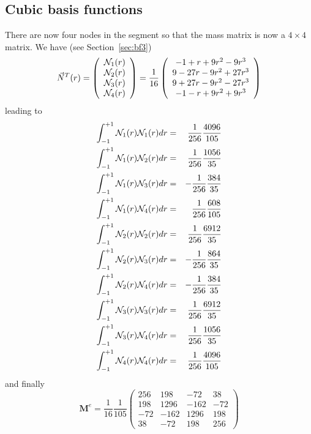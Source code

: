 \subsection{Cubic basis functions}
There are now four nodes in the segment so that the mass matrix 
is now a $4\times4$ matrix. We have (see Section~\ref{sec:bf3}) 
\begin{equation}
{\vec N}^T(r) = 
\left(
\begin{array}{c}
{\mathcal{N}}_1(r) \\ 
{\mathcal{N}}_2(r) \\ 
{\mathcal{N}}_3(r) \\ 
{\mathcal{N}}_4(r) 
\end{array}
\right)
=
\frac{1}{16}
\left(
\begin{array}{c}
 -1+  r+9r^2- 9r^3  \\ 
  9-27r-9r^2+27r^3  \\
  9+27r-9r^2-27r^3  \\
 -1-  r+9r^2+ 9r^3  
\end{array}
\right)
\end{equation}
leading to
\begin{eqnarray}
\int_{-1}^{+1} {\mathcal{N}}_1(r) {\mathcal{N}}_1(r) dr &=&  \frac{1}{256}\frac{4096}{105} \nonumber\\ 
\int_{-1}^{+1} {\mathcal{N}}_1(r) {\mathcal{N}}_2(r) dr &=&  \frac{1}{256}\frac{1056}{35} \nonumber\\
\int_{-1}^{+1} {\mathcal{N}}_1(r) {\mathcal{N}}_3(r) dr &=& -\frac{1}{256}\frac{384}{35} \nonumber\\
\int_{-1}^{+1} {\mathcal{N}}_1(r) {\mathcal{N}}_4(r) dr &=&  \frac{1}{256}\frac{608}{105} \nonumber\\
\int_{-1}^{+1} {\mathcal{N}}_2(r) {\mathcal{N}}_2(r) dr &=&  \frac{1}{256}\frac{6912}{35} \nonumber\\
\int_{-1}^{+1} {\mathcal{N}}_2(r) {\mathcal{N}}_3(r) dr &=& -\frac{1}{256}\frac{864}{35} \nonumber\\
\int_{-1}^{+1} {\mathcal{N}}_2(r) {\mathcal{N}}_4(r) dr &=& -\frac{1}{256}\frac{384}{35} \nonumber\\
\int_{-1}^{+1} {\mathcal{N}}_3(r) {\mathcal{N}}_3(r) dr &=&  \frac{1}{256}\frac{6912}{35}\nonumber\\
\int_{-1}^{+1} {\mathcal{N}}_3(r) {\mathcal{N}}_4(r) dr &=&  \frac{1}{256}\frac{1056}{35}\nonumber\\
\int_{-1}^{+1} {\mathcal{N}}_4(r) {\mathcal{N}}_4(r) dr &=&  \frac{1}{256}\frac{4096}{105}\nonumber
\end{eqnarray}
and finally 
\begin{equation}
\boxed{
{\bm M}^e 
=
\frac{1}{16}\frac{1}{105}
\left(
\begin{array}{cccc}
256 & 198 & -72  & 38  \\
198 & 1296 & -162 & -72 \\
-72 & -162 & 1296 & 198 \\
38 & -72 & 198 & 256
\end{array}
\right)}
\end{equation}

